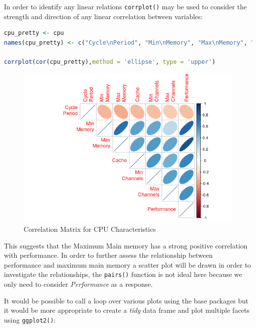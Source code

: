 \documentclass[
]{article}
\newcommand{\passthrough}[1]{#1}
\begin{document}
In order to identify any linear relations
\passthrough{\lstinline!corrplot()!} may be used to consider the
strength and direction of any linear correlation between variables:

\begin{lstlisting}[language=R]
cpu_pretty <- cpu
names(cpu_pretty) <- c("Cycle\nPeriod", "Min\nMemory", "Max\nMemory", "Cache", "Min\nChannels", "Max\nChannels", "Performance")

corrplot(cor(cpu_pretty),method = 'ellipse', type = 'upper')
\end{lstlisting}

\begin{figure}
\centering
\includegraphics[width=0.7\linewidth]{SecAssignment_files/figure-html/corrplot-1.png}
\caption{Correlation Matrix for CPU Characteristics}
\label{corrplot}
\end{figure}



This suggests that the Maximum Main memory has a strong positive
correlation with performance. In order to further assess the
relationship between performance and maximum main memory a scatter plot
will be drawn in order to investigate the relationships, the
\passthrough{\lstinline!pairs()!} function is not ideal here because we
only need to consider \emph{Performance} as a response.

It would be possible to call a loop over various plots using the base
packages but it would be more appropriate to create a \emph{tidy} data
frame and plot multiple facets using
\passthrough{\lstinline!ggplot2()!}:
\end{document}
